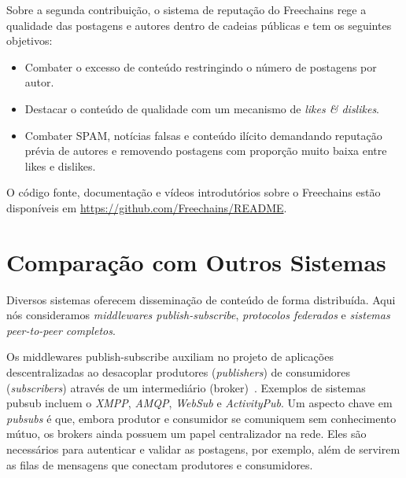 \documentclass[12pt]{article}
\newcommand{\FC} {Freechains\xspace}
\begin{document}
%
Sobre a segunda contribuição, o sistema de reputação do \FC rege a qualidade
das postagens e autores dentro de cadeias públicas e tem os seguintes
objetivos:
%
\begin{itemize}
\item Combater o excesso de conteúdo restringindo o número de postagens por autor.
\item Destacar o conteúdo de qualidade com um mecanismo de \emph{likes \& dislikes}.
\item Combater SPAM, notícias falsas e conteúdo ilícito demandando reputação
      prévia de autores e removendo postagens com proporção muito baixa entre
      likes e dislikes.
\end{itemize}
%
O código fonte, documentação e vídeos introdutórios sobre o \FC estão
disponíveis em \url{https://github.com/Freechains/README}.


\section{Comparação com Outros Sistemas}
\label{sec.related}

Diversos sistemas oferecem disseminação de conteúdo de forma distribuída.
Aqui nós consideramos \emph{middlewares publish-subscribe},
\emph{protocolos federados} e \emph{sistemas peer-to-peer completos}.


Os middlewares publish-subscribe auxiliam no projeto de aplicações
descentralizadas ao desacoplar produtores (\emph{publishers}) de consumidores
(\emph{subscribers}) através de um intermediário (broker)~\cite{TODO}.
Exemplos de sistemas pubsub incluem o \emph{XMPP}, \emph{AMQP}, \emph{WebSub} e
\emph{ActivityPub}.
Um aspecto chave em \emph{pubsubs} é que, embora produtor e consumidor se
comuniquem sem conhecimento mútuo, os brokers ainda possuem um papel
centralizador na rede.
Eles são necessários para autenticar e validar as postagens, por exemplo, além
de servirem as filas de mensagens que conectam produtores e consumidores.
\end{document}
